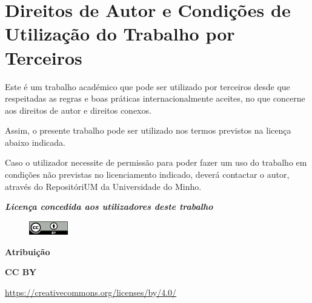 \chapter{Direitos de Autor e Condições de Utilização do Trabalho por Terceiros}

Este é um trabalho académico que pode ser utilizado por terceiros desde que respeitadas as regras e
boas práticas internacionalmente aceites, no que concerne aos direitos de autor e direitos conexos.

Assim, o presente trabalho pode ser utilizado nos termos previstos na licença abaixo indicada.

Caso o utilizador necessite de permissão para poder fazer um uso do trabalho em condições não previstas
no licenciamento indicado, deverá contactar o autor, através do RepositóriUM da Universidade do Minho.

\textit{\textbf{Licença concedida aos utilizadores deste trabalho}}

\begin{figure}[H]
    \includegraphics[width=0.15\textwidth]{copyrights.png}
\end{figure}

\vspace{-0.5cm}

\noindent\textbf{Atribuição}

\noindent\textbf{CC BY}

\noindent\url{https://creativecommons.org/licenses/by/4.0/}
